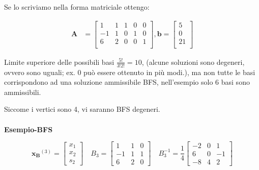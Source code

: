\documentclass[a4paper, 11pt]{article}
\begin{document}
        Se lo scriviamo nella forma matriciale ottengo:


        \begin{align*}
            \mathbf{A} &= 
            \begin{bmatrix}
            1 & 1 & 1 & 0 & 0 \\
            -1 & 1 & 0 & 1 & 0 \\
            6 & 2 & 0 & 0 & 1 \\
            \end{bmatrix},
            \mathbf{b} = 
                \begin{bmatrix}
                    5 \\
                    0 \\
                    21 \\
                \end{bmatrix}
        \end{align*}

        Limite superiore delle possibili basi $\frac{5!}{3!2!} = 10$, (alcune soluzioni sono degeneri, ovvero sono uguali; ex. 0 può essere ottenuto in più modi.), ma non tutte le basi corrispondono ad una soluzione ammissibile BFS, nell’esempio solo 6 basi sono ammissibili.

        Siccome i vertici sono 4, vi saranno BFS degeneri.      
        
        \paragraph{}
        \textbf{Esempio-BFS}

        \[
            \mathbf{x_B}^{(3)} =
            \begin{bmatrix}
                x_1 \\ x_2 \\s_2
            \end{bmatrix}
            \quad
            B_3 =
            \begin{bmatrix}
                1 & 1 & 0 \\
                -1 & 1 & 1 \\
                6 & 2 & 0
            \end{bmatrix}
            \quad
            B_3^{-1} =
            \frac{1}{4}
            \begin{bmatrix}
                -2 & 0 & 1 \\
                6 & 0 & -1 \\
                -8 & 4 & 2
            \end{bmatrix}
        \]
            
\end{document}

